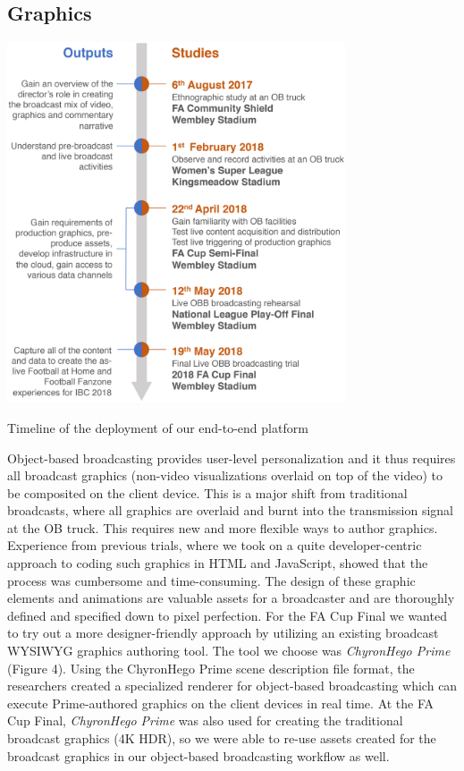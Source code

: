 \documentclass[sigchi-a, authorversion]{acmart}
\begin{document}
\subsection{Graphics}

\begin{marginfigure}
    \hspace*{-2cm}
    \includegraphics[width=10cm]{Figures/timeline.png}
    \caption{Timeline of the deployment of our end-to-end platform}
    \label{fig:timeline}
\end{marginfigure}

Object-based broadcasting provides user-level personalization and it thus
requires all broadcast graphics (non-video visualizations overlaid on top of
the video) to be composited on the client device. This is a major shift from
traditional broadcasts, where all graphics are overlaid and burnt into the
transmission signal at the OB truck. This requires new and more flexible ways
to author graphics. Experience from previous trials, where we took on a quite
developer-centric approach to coding such graphics in HTML and JavaScript,
showed that the process was cumbersome and time-consuming. The design of these
graphic elements and animations are valuable assets for a broadcaster and are
thoroughly defined and specified down to pixel perfection. For the FA Cup Final
we wanted to try out a more designer-friendly approach by utilizing an existing
broadcast WYSIWYG graphics authoring tool. The tool we choose was
\emph{ChyronHego Prime} (Figure 4). Using the ChyronHego Prime scene
description file format, the researchers created a specialized renderer for
object-based broadcasting which can execute Prime-authored graphics on the
client devices in real time. At the FA Cup Final, \emph{ChyronHego Prime} was also used for
creating the traditional broadcast graphics (4K HDR), so we were able to re-use
assets created for the broadcast graphics in our object-based broadcasting
workflow as well.
\end{document}
